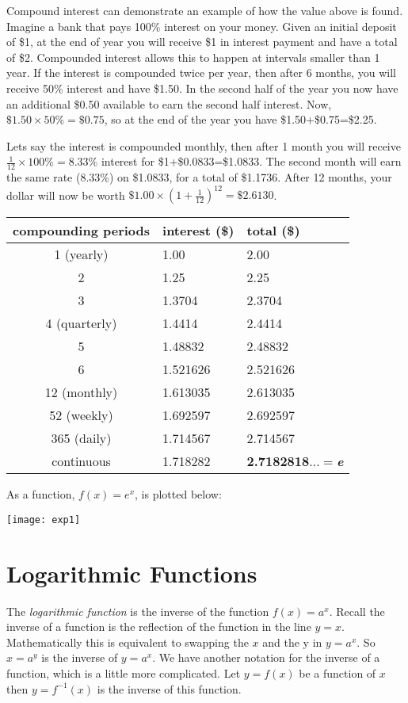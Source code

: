 Compound interest can demonstrate an example of  how the value above is found. Imagine a bank that pays 100\% interest on your money. Given an initial deposit of \$1, at the end of year you will receive \$1 in interest payment and have a total of \$2. Compounded interest allows this to happen at intervals smaller than 1 year. If the interest is compounded twice per year, then after 6 months, you will receive 50\% interest and have \$1.50. In the second half of the year you now have an additional \$0.50 available to earn the second half interest. Now, $\$1.50\times50\%=\$0.75$, so at the end of the year you have \$1.50+\$0.75=\$2.25.

Lets say the interest is compounded monthly, then after 1 month you will receive $\frac{1}{12}\times 100\%=8.33\%$ interest for \$1+\$0.0833=\$1.0833. The second month will earn the same rate (8.33\%) on \$1.0833, for a total of \$1.1736. After 12 months, your dollar will now be worth $\$1.00\times\left(1+\frac{1}{12}\right)^{12}=\$2.6130$. 
\begin{center}
\begin{tabular}{cll}
	\toprule
	compounding periods&interest (\$)&total (\$)\\
	\midrule
	1 (yearly)&1.00&2.00\\
	2&1.25&2.25\\
	3&1.3704 &2.3704\\
	4 (quarterly)& 1.4414 & 2.4414 \\
	5& 1.48832 & 2.48832 \\
	6& 1.521626&2.521626\\\midrule
	12 (monthly)& 1.613035&2.613035 \\\midrule
	52 (weekly)&1.692597 &2.692597\\\midrule
	365 (daily)&1.714567 &2.714567\\\midrule
	continuous& 1.718282&\textbf{2.7182818}$...=$\textit{\textbf{e}}\\
	\bottomrule
\end{tabular}
\end{center}

As a function, $f(x)=e^x$, is plotted below:
\begin{center}
	\texttt{[image: exp1]}
\end{center}
\section{Logarithmic Functions}
The \emph{logarithmic function} is the inverse of the function $f (x) =a^{x}$. Recall the inverse of a function is the reflection of the function in the line $y =x$. Mathematically this is equivalent to swapping the $x$ and the y in $y =a^{x}$. So $x =a^{y}$ is the inverse of $y =a^{x}$. We have another notation for the inverse of a function, which is a little more complicated. Let $y =f (x)$ be a function of $x$ then $y =f^{ -1} (x)$ is the inverse of this function. 


